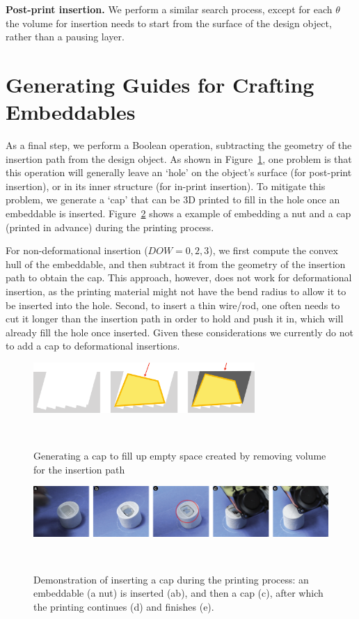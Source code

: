 \textbf{Post-print insertion.} We perform a similar search process, except for each $\theta$ the volume for insertion needs to start from the surface of the design object, rather than a pausing layer.


\section{Generating Guides for Crafting Embeddables}
As a final step, we perform a Boolean operation, subtracting the geometry of the insertion path from the design object. As shown in Figure~\ref{fig:cap}, one problem is that this operation will generally leave an `hole' on the object's surface (for post-print insertion), or in its inner structure (for in-print insertion). To mitigate this problem, we generate a `cap' that can be 3D printed to fill in the hole once an embeddable is inserted. Figure~\ref{fig:cap_printing} shows a example of embedding a nut and a cap (printed in advance) during the printing process.

For non-deformational insertion ($DOW=0, 2, 3$), we first compute the convex hull of the embeddable, and then subtract it from the geometry of the insertion path to obtain the cap. This approach, however, does not work for deformational insertion, as the printing material might not have the bend radius to allow it to be inserted into the hole. Second, to insert a thin wire/rod, one often needs to cut it longer than the insertion path in order to hold and push it in, which will already fill the hole once inserted. Given these considerations we currently do not to add a cap to deformational insertions.

\begin{figure} [h]
  \centering
  \includegraphics[width=0.75\textwidth]{figures/cap}
  \caption{Generating a cap to fill up empty space created by removing volume for the insertion path}~\label{fig:cap}
\end{figure}

\begin{figure} [h]
  \centering
  \includegraphics[width=1\textwidth]{figures/cap_printing}
  \caption{Demonstration of inserting a cap during the printing process: an embeddable (a nut) is inserted (ab), and then a cap (c), after which the printing continues (d) and finishes (e).}~\label{fig:cap_printing}
\end{figure}

